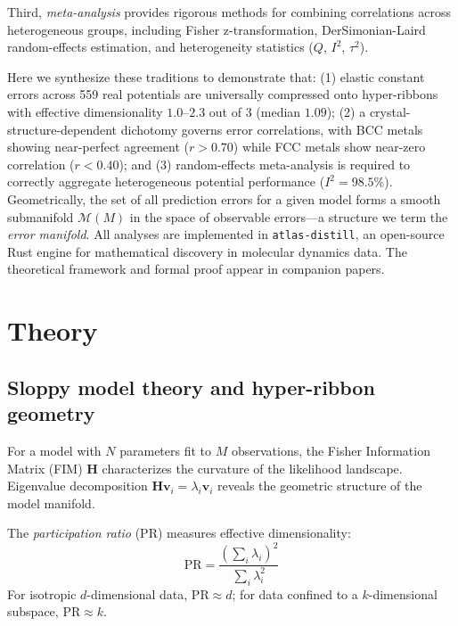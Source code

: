 \documentclass[twocolumn,10pt]{article}
\begin{document}
Third, \textit{meta-analysis} provides rigorous methods for combining correlations across heterogeneous groups, including Fisher z-transformation, DerSimonian-Laird random-effects estimation, and heterogeneity statistics ($Q$, $I^2$, $\tau^2$)\cite{hedges1985,borenstein2009,borenstein2010,dersimonian1986,higgins2003}.

Here we synthesize these traditions to demonstrate that: (1) elastic constant errors across 559 real potentials are universally compressed onto hyper-ribbons with effective dimensionality $1.0$--$2.3$ out of 3 (median $1.09$); (2) a crystal-structure-dependent dichotomy governs error correlations, with BCC metals showing near-perfect agreement ($r>0.70$) while FCC metals show near-zero correlation ($r<0.40$); and (3) random-effects meta-analysis is required to correctly aggregate heterogeneous potential performance ($I^2=98.5\%$). Geometrically, the set of all prediction errors for a given model forms a smooth submanifold $\mathcal{M}(M)$ in the space of observable errors---a structure we term the \textit{error manifold}. All analyses are implemented in \texttt{atlas-distill}, an open-source Rust engine for mathematical discovery in molecular dynamics data. The theoretical framework and formal proof appear in companion papers\cite{welcing2026projection,welcing2026formal}.

\section{Theory}

\subsection{Sloppy model theory and hyper-ribbon geometry}

For a model with $N$ parameters fit to $M$ observations, the Fisher Information Matrix (FIM) $\mathbf{H}$ characterizes the curvature of the likelihood landscape. Eigenvalue decomposition $\mathbf{H}\mathbf{v}_i = \lambda_i \mathbf{v}_i$ reveals the geometric structure of the model manifold.

The \textit{participation ratio} (PR) measures effective dimensionality:
\begin{equation}
\text{PR} = \frac{(\sum_i \lambda_i)^2}{\sum_i \lambda_i^2}
\end{equation}
For isotropic $d$-dimensional data, $\text{PR} \approx d$; for data confined to a $k$-dimensional subspace, $\text{PR} \approx k$.
\end{document}
